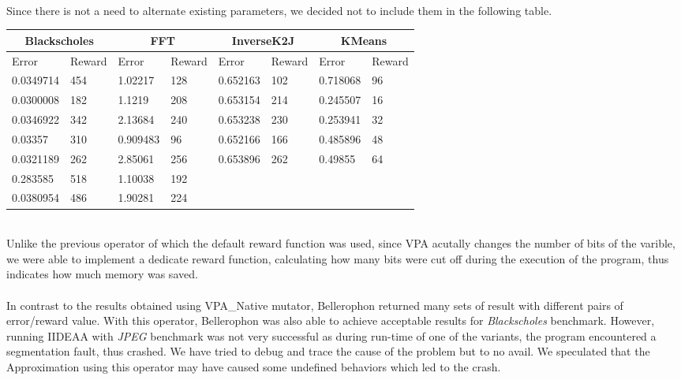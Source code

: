 \newpage
~\\
Since there is not a need to alternate existing parameters, we decided not to include them in the following table.\\
\begingroup
\begin{table}[H]
\centering
\begin{tabular}{|l|l|l|l|l|l|l|l|}
\hline
\multicolumn{2}{|c|}{Blackscholes} & \multicolumn{2}{c|}{FFT} & \multicolumn{2}{c|}{InverseK2J} & \multicolumn{2}{c|}{KMeans} \\ \hline
Error & Reward & Error & Reward & Error & Reward & Error & Reward \\ \hline
0.0349714 & 454 & 1.02217 & 128 & 0.652163 & 102 & 0.718068 & 96 \\ \hline
0.0300008 & 182 & 1.1219 & 208 & 0.653154 & 214 & 0.245507 & 16 \\ \hline
0.0346922 & 342 & 2.13684 & 240 & 0.653238 & 230 & 0.253941 & 32 \\ \hline
0.03357 & 310 & 0.909483 & 96 & 0.652166 & 166 & 0.485896 & 48 \\ \hline
0.0321189 & 262 & 2.85061 & 256 & 0.653896 & 262 & 0.49855 & 64 \\ \hline
0.283585 & 518 & 1.10038 & 192 &  &  &  &  \\ \hline
0.0380954 & 486 & 1.90281 & 224 &  &  &  &  \\ \hline
\end{tabular}
\end{table}
\endgroup
~\\
Unlike the previous operator of which the default reward function was used, since VPA acutally changes the number of bits of the varible, we were able to implement a dedicate reward function, calculating how many bits were cut off during the execution of the program, thus indicates how much memory was saved.\\
~\\
In contrast to the results obtained using VPA\_Native mutator, Bellerophon returned many sets of result with different pairs of error/reward value. With this operator, Bellerophon was also able to achieve acceptable results for \textit{Blackscholes} benchmark. However, running IIDEAA with \textit{JPEG} benchmark was not very successful as during run-time of one of the variants, the program encountered a segmentation fault, thus crashed. We have tried to debug and trace the cause of the problem but to no avail. We speculated that the Approximation using this operator may have caused some undefined behaviors which led to the crash. \\

